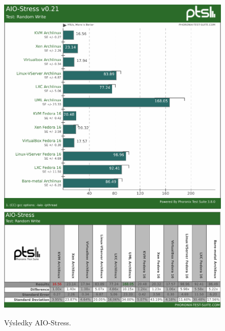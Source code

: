\begin{figure}[ht!]
  \centering
  \includegraphics[width=15cm]{obr/bench/aio-stress-graph}
  \includegraphics[width=15cm]{obr/bench/aio-stress-table}
  \caption{Výsledky AIO-Stress.}
  \label{obr:bench:aio}
\end{figure}




